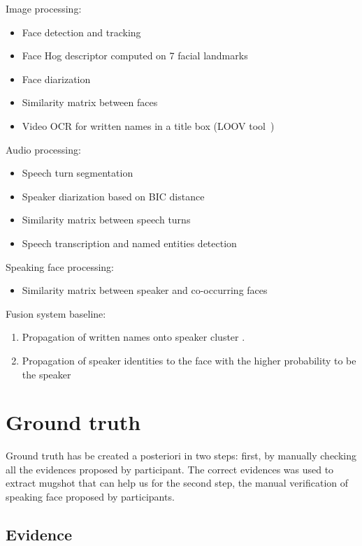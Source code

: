 \documentclass{acm_proc_article-me}
\begin{document}
Image processing:
\begin{itemize}
\item Face detection and tracking
\item Face Hog descriptor computed on 7 facial landmarks
\item Face diarization
\item Similarity matrix between faces
\item Video OCR for written names in a title box (LOOV tool~\cite{POIGNANT--ICME--2012})
\end{itemize}

Audio processing:
\begin{itemize}
\item Speech turn segmentation
\item Speaker diarization based on BIC distance
\item Similarity matrix between speech turns
\item Speech transcription and named entities detection
\end{itemize}

Speaking face processing:
\begin{itemize}
\item Similarity matrix between speaker and co-occurring faces
\end{itemize}

Fusion system baseline:
\begin{enumerate}
\item Propagation of written names onto speaker cluster \cite{POIGNANT--INTERSPEECH--2012}. 
\item Propagation of speaker identities to the face with the higher probability to be the speaker
\end{enumerate}




\section{Ground truth}

Ground truth has be created a posteriori in  two steps: first, by manually checking all the evidences proposed by participant. The correct evidences was used to extract mugshot that can help us for the second step, the manual verification of speaking face proposed by participants.

\subsection{Evidence}
\end{document}
